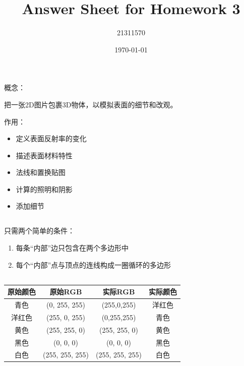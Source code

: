 \documentclass{article}
\begin{document}
\title{Answer Sheet for Homework 3}
\author{21311570}
\date{\today}

\maketitle

\section{}

\subsection{}

概念：

把一张2D图片包裹3D物体，以模拟表面的细节和改观。

作用：

\begin{itemize}[leftmargin=2cm]
    \item 定义表面反射率的变化
    \item 描述表面材料特性
    \item 法线和置换贴图
    \item 计算的照明和阴影
    \item 添加细节
\end{itemize}

\subsection{}

只需两个简单的条件：

\begin{enumerate}[leftmargin=2cm]
    \item 每条“内部”边只包含在两个多边形中
    \item 每个“内部”点与顶点的连线构成一圈循环的多边形
\end{enumerate}

\subsection{}

\begin{tabular}{|c|c|c|c|}
    \hline
    原始颜色 & 原始RGB           & 实际RGB           & 实际颜色 \\
    \hline
    青色   & (0, 255, 255)   & (255,0,255)     & 洋红色  \\
    \hline
    洋红色  & (255, 0, 255)   & (0,255,255)     & 青色   \\
    \hline
    黄色   & (255, 255, 0)   & (255, 255, 0)   & 黄色   \\
    \hline
    黑色   & (0, 0, 0)       & (0, 0, 0)       & 黑色   \\
    \hline
    白色   & (255, 255, 255) & (255, 255, 255) & 白色   \\
    \hline
\end{tabular}
\end{document}
